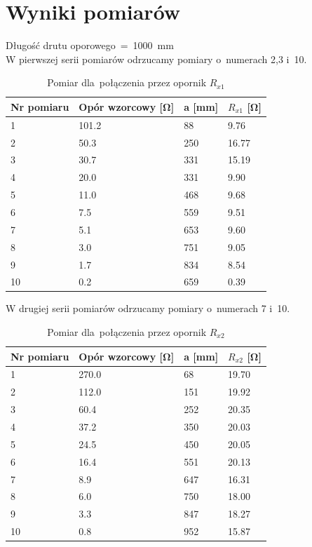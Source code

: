 \documentclass{fizraport}
\begin{document}
\newpage%
\addtocounter{page}{2}%

\section{Wyniki pomiarów}
\vspace{-1.5em}
\label{sec:wyniki}
\begin{table}[!tbh]
\small
Długość drutu oporowego~=~\SI{1000}{\milli\metre}\\
W pierwszej serii pomiarów odrzucamy pomiary o~numerach 2,3 i~10.
\caption{Pomiar dla~połączenia przez opornik $R_{x1}$}
\centering
\begin{tabular}{|l|l|l|l|}
\hline
Nr pomiaru&Opór wzorcowy [\si{\ohm}] & a [\si{\milli\metre}] & $R_{x1}$ [\si{\ohm}]           \\ \hline
1&101.2              & 88     & 9.76    \\ \hline
2&50.3               & 250    & 16.77   \\ \hline
3&30.7               & 331    & 15.19   \\ \hline
4&20.0                 & 331    & 9.90    \\ \hline
5&11.0                 & 468    & 9.68    \\ \hline
6&7.5                & 559    & 9.51    \\ \hline
7&5.1                 & 653    & 9.60    \\ \hline
8&3.0                  & 751    & 9.05    \\ \hline
9&1.7                & 834    & 8.54    \\ \hline
10&0.2               & 659    & 0.39    \\ \hline
\end{tabular}
\end{table}
%
\begin{table}[!tbh]
\small
W drugiej serii pomiarów odrzucamy pomiary o~numerach 7 i~10.
\caption{Pomiar dla~połączenia przez opornik $R_{x2}$}
\centering
\begin{tabular}{|l|l|l|l|}
\hline
Nr pomiaru&Opór wzorcowy [\si{\ohm}] & a [\si{\milli\metre}] & $R_{x2}$ [\si{\ohm}]           \\ \hline
1&270.0                & 68     & 19.70 \\ \hline
2&112.0                & 151    & 19.92 \\ \hline
3&60.4               & 252    & 20.35 \\ \hline
4&37.2               & 350    & 20.03 \\ \hline
5&24.5               & 450    & 20.05 \\ \hline
6&16.4               & 551    & 20.13 \\ \hline
7&8.9                & 647    & 16.31 \\ \hline
8&6.0                  & 750    & 18.00 \\ \hline
9&3.3                & 847    & 18.27 \\ \hline
10&0.8               & 952    & 15.87 \\ \hline
\end{tabular}
\end{table}
\end{document}
